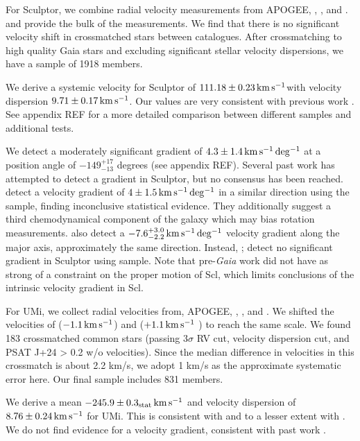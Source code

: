 For Sculptor, we combine radial velocity measurements from APOGEE,
\citet{sestito+2023a}, \citet{tolstoy+2023}, and \citet{WMO2009}.
\citet{tolstoy+2023} and \citet{WMO2009} provide the bulk of the
measurements. We find that there is no significant velocity shift in
crossmatched stars between catalogues. After crossmatching to high
quality Gaia stars and excluding significant stellar velocity
dispersions, we have a sample of 1918 members.

We derive a systemic velocity for Sculptor of
\(111.18\pm0.23\,{\rm km\,s^{-1}}\)with velocity dispersion \(9.71\pm0.17\,{\rm km\,s^{-1}}\).
Our values are very consistent with previous work
\citep[e.g.][\citet{arroyo-polonio+2024},
\citet{battaglia+2008}]{walker+2009}. See appendix REF for a more
detailed comparison between different samples and additional tests.

We detect a moderately significant gradient of \(4.3\pm1.4\,{\rm km\,s^{-1}\,deg^{-1}}\) at
a position angle of \(-149_{-13}^{+17}\) degrees (see appendix REF).
Several past work has attempted to detect a gradient in Sculptor, but no
consensus has been reached. \citet{arroyo-polonio+2024} detect a
velocity gradient of \(4\pm1.5\,{\rm km\,s^{-1}\,deg^{-1}}\) in a similar direction using
the \citet{tolstoy+2023} sample, finding inconclusive statistical
evidence. They additionally suggest a third chemodynamical component of
the galaxy which may bias rotation measurements. \citet{battaglia+2008}
also detect a \(-7.6_{-2.2}^{+3.0}\,{\rm km\,s^{-1}\,deg^{-1}}\) velocity gradient along
the major axis, approximately the same direction. Instead,
\citet{strigari2010}; \citet{martinez-garcia+2023} detect no significant
gradient in Sculptor using \citet{WMO2009} sample. Note that
pre-\emph{Gaia} work did not have as strong of a constraint on the
proper motion of Scl, which limits conclusions of the intrinsic velocity
gradient in Scl.

For UMi, we collect radial velocities from, APOGEE,
\citet{sestito+2023b}, \citet{pace+2020}, and \citet{spencer+2018}. We
shifted the velocities of \citet{spencer+2018} (\(-1.1\,{\rm km\,s^{-1}}\)) and
\citet{pace+2020} (\(+1.1\,{\rm km\,s^{-1}}\) ) to reach the same scale. We found
183 crossmatched common stars (passing 3\(\sigma\) RV cut, velocity
dispersion cut, and PSAT J+24 \textgreater{} 0.2 w/o velocities). Since
the median difference in velocities in this crossmatch is about 2.2
km/s, we adopt 1 km/s as the approximate systematic error here. Our
final sample includes 831 members.

We derive a mean \(-245.9\pm0.3_{\rm stat}\,{\rm km\,s^{-1}}\) and velocity
dispersion of \(8.76\pm0.24\,{\rm km\,s^{-1}}\) for UMi. This is consistent with
\citet{pace+2020} and to a lesser extent with \citet{spencer+2018}. We
do not find evidence for a velocity gradient, consistent with past work
\citep{pace+2020, martinez-garcia+2023}.

